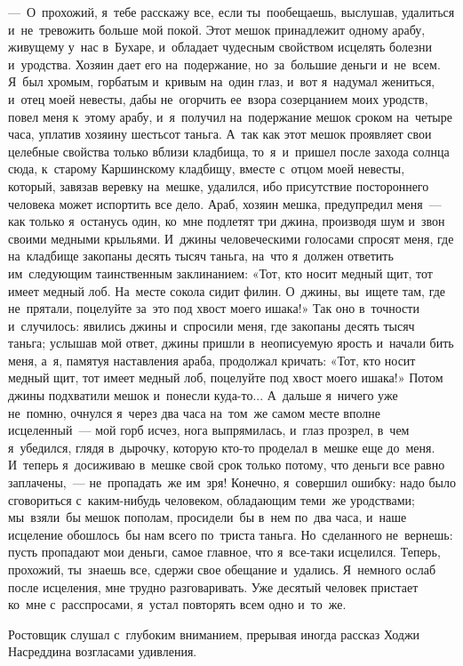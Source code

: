 \documentclass[12pt,a4paper]{book}
\begin{document}
—~О~прохожий, я~тебе расскажу все, если ты~пообещаешь, выслушав, удалиться и~не~тревожить больше мой покой. Этот мешок принадлежит одному арабу, живущему у~нас в~Бухаре, и~обладает чудесным свойством исцелять болезни и~уродства. Хозяин дает его на~подержание, но~за~большие деньги и~не~всем. Я~был хромым, горбатым и~кривым на~один глаз, и~вот я~надумал жениться, и~отец моей невесты, дабы не~огорчить ее~взора созерцанием моих уродств, повел меня к~этому арабу, и~я~получил на~подержание мешок сроком на~четыре часа, уплатив хозяину шестьсот таньга. А~так как этот мешок проявляет свои целебные свойства только вблизи кладбища, то~я~и~пришел после захода солнца сюда, к~старому Каршинскому кладбищу, вместе с~отцом моей невесты, который, завязав веревку на~мешке, удалился, ибо присутствие постороннего человека может испортить все дело. Араб, хозяин мешка, предупредил меня~— как только я~останусь один, ко~мне подлетят три джина, производя шум и~звон своими медными крыльями. И~джины человеческими голосами спросят меня, где на~кладбище закопаны десять тысяч таньга, на~что я~должен ответить им~следующим таинственным заклинанием: «Тот, кто носит медный щит, тот имеет медный лоб. На~месте сокола сидит филин. О~джины, вы~ищете там, где не~прятали, поцелуйте за~это под хвост моего ишака!» Так оно в~точности и~случилось: явились джины и~спросили меня, где закопаны десять тысяч таньга; услышав мой ответ, джины пришли в~неописуемую ярость и~начали бить меня, а~я, памятуя наставления араба, продолжал кричать: «Тот, кто носит медный щит, тот имеет медный лоб, поцелуйте под хвост моего ишака!» Потом джины подхватили мешок и~понесли куда-то... А~дальше я~ничего уже не~помню, очнулся я~через два часа на~том~же самом месте вполне исцеленный~— мой горб исчез, нога выпрямилась, и~глаз прозрел, в~чем я~убедился, глядя в~дырочку, которую кто-то проделал в~мешке еще до~меня. И~теперь я~досиживаю в~мешке свой срок только потому, что деньги все равно заплачены,~— не~пропадать~же им~зря! Конечно, я~совершил ошибку: надо было сговориться с~каким-нибудь человеком, обладающим теми~же уродствами; мы~взяли~бы мешок пополам, просидели~бы в~нем по~два часа, и~наше исцеление обошлось~бы нам всего по~триста таньга. Но~сделанного не~вернешь: пусть пропадают мои деньги, самое главное, что я~все-таки исцелился. Теперь, прохожий, ты~знаешь все, сдержи свое обещание и~удались. Я~немного ослаб после исцеления, мне трудно разговаривать. Уже десятый человек пристает ко~мне с~расспросами, я~устал повторять всем одно и~то~же.

Ростовщик слушал с~глубоким вниманием, прерывая иногда рассказ Ходжи Насреддина возгласами удивления.
\end{document}
